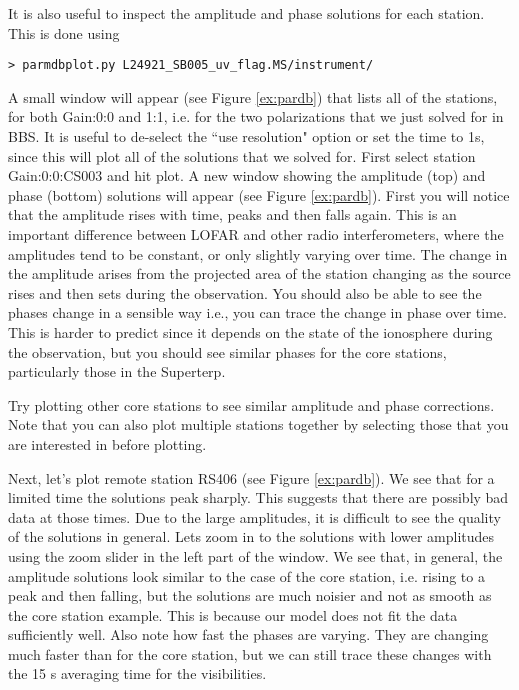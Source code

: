 It is also useful to inspect the amplitude and phase solutions for each station. This is done using
\begin{verbatim}
> parmdbplot.py L24921_SB005_uv_flag.MS/instrument/
\end{verbatim}

A small window will appear (see Figure \ref{ex:pardb}) that lists all of the stations, for both Gain:0:0 and 1:1, i.e. for the two polarizations that we just solved for in BBS. It is useful to de-select the ``use resolution" option or set the time to 1s, since this will plot all of the solutions that we solved for. First select station Gain:0:0:CS003 and hit plot. A new window showing the amplitude (top) and phase (bottom) solutions will appear (see Figure \ref{ex:pardb}). First you will notice that the amplitude rises with time, peaks and then falls again. This is an important difference between LOFAR and other radio interferometers, where the amplitudes tend to be constant, or only slightly varying over time. The change in the amplitude arises from the projected area of the station changing as the source rises and then sets during the observation. You should also be able to see the phases change in a sensible way i.e., you can trace the change in phase over time. This is harder to predict since it depends on the state of the ionosphere during the observation, but you should see similar phases for the core stations, particularly those in the Superterp.

Try plotting other core stations to see similar amplitude and phase corrections. Note that you can also plot multiple stations together by selecting those that you are interested in before plotting.

Next, let's plot remote station RS406 (see Figure \ref{ex:pardb}). We see that for a limited time the solutions peak sharply. This suggests that there are possibly bad data at those times. Due to the large amplitudes, it is difficult to see the quality of the solutions in general. Lets zoom in to the solutions with lower amplitudes using the zoom slider in the left part of the window. We see that, in general, the amplitude solutions look similar to the case of the core station, i.e. rising to a peak and then falling, but the solutions are much noisier and not as smooth as the core station example. This is because our model does not fit the data sufficiently well. Also note how fast the phases are varying. They are changing much faster than for the core station, but we can still trace these changes with the 15 s averaging time for the visibilities.

